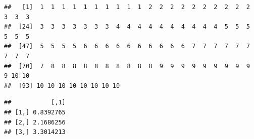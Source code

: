 \documentclass[]{article}
\newenvironment{Shaded}{\begin{snugshade}}{\end{snugshade}}
\newcommand{\CommentTok}[1]{\textcolor[rgb]{0.56,0.35,0.01}{\textit{#1}}}
\newcommand{\DataTypeTok}[1]{\textcolor[rgb]{0.13,0.29,0.53}{#1}}
\newcommand{\DecValTok}[1]{\textcolor[rgb]{0.00,0.00,0.81}{#1}}
\newcommand{\KeywordTok}[1]{\textcolor[rgb]{0.13,0.29,0.53}{\textbf{#1}}}
\newcommand{\NormalTok}[1]{#1}
\newcommand{\OperatorTok}[1]{\textcolor[rgb]{0.81,0.36,0.00}{\textbf{#1}}}
\newcommand{\StringTok}[1]{\textcolor[rgb]{0.31,0.60,0.02}{#1}}
\begin{document}
\begin{Shaded}
\end{Shaded}

\begin{verbatim}
##   [1]  1  1  1  1  1  1  1  1  1  1  2  2  2  2  2  2  2  2  2  2  3  3  3
##  [24]  3  3  3  3  3  3  3  4  4  4  4  4  4  4  4  4  4  5  5  5  5  5  5
##  [47]  5  5  5  5  6  6  6  6  6  6  6  6  6  6  7  7  7  7  7  7  7  7  7
##  [70]  7  8  8  8  8  8  8  8  8  8  8  9  9  9  9  9  9  9  9  9  9 10 10
##  [93] 10 10 10 10 10 10 10 10
\end{verbatim}

\begin{Shaded}
\end{Shaded}

\begin{verbatim}
##           [,1]
## [1,] 0.8392765
## [2,] 2.1686256
## [3,] 3.3014213
\end{verbatim}
\end{document}
